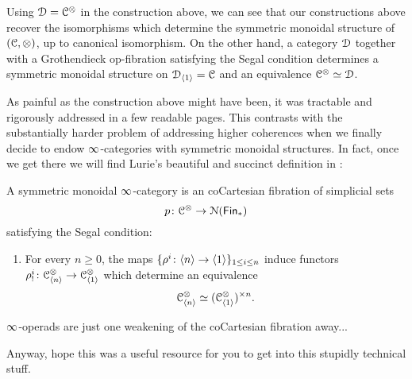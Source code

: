 \begin{construction}
Using $\mathcal D=\mathcal C^{\otimes}$ in the construction above, we can see that our constructions above recover the isomorphisms which determine the symmetric monoidal structure of $(\mathcal C,\otimes)$, up to canonical isomorphism. On the other hand, a category $\mathcal D$ together with a Grothendieck op-fibration satisfying the Segal condition determines a symmetric monoidal structure on $\mathcal D_{\langle 1 \rangle} = \mathcal C$ and an equivalence $\mathcal C^{\otimes}\simeq \mathcal D$.
\end{construction}
As painful as the construction above might have been, it was tractable and rigorously addressed in a few readable pages. This contrasts with the substantially harder problem of addressing higher coherences when we finally decide to endow $\operatorname{\infty}$-categories with symmetric monoidal structures. In fact, once we get there we will find Lurie's beautiful and succinct definition in \cite{HA}:
\begin{definition}
    A symmetric monoidal $\operatorname{\infty}$-category is an coCartesian fibration of simplicial sets \[p\colon \mathcal C^{\otimes} \rightarrow \mathcal N(\operatorname{\sf Fin}_\ast)\] satisfying the Segal condition:
    \begin{enumerate}
        \item For every $n\geq 0$, the maps $\{\rho^{i}\colon \langle n \rangle \rightarrow \langle 1 \rangle\}_{1\leq i \leq n}$ induce functors $\rho^{i}_!\colon \mathcal C^{\otimes}_{\langle n \rangle} \rightarrow \mathcal C^{\otimes}_{\langle 1\rangle}$ which determine an equivalence \[\mathcal C^{\otimes}_{\langle n \rangle}\simeq (\mathcal C_{\langle 1 \rangle}^{\otimes})^{\times n}.\]
    \end{enumerate}
\end{definition}

$\operatorname{\infty}$-operads are just one weakening of the coCartesian fibration away...


Anyway, hope this was a useful resource for you to get into this stupidly technical stuff.

\




